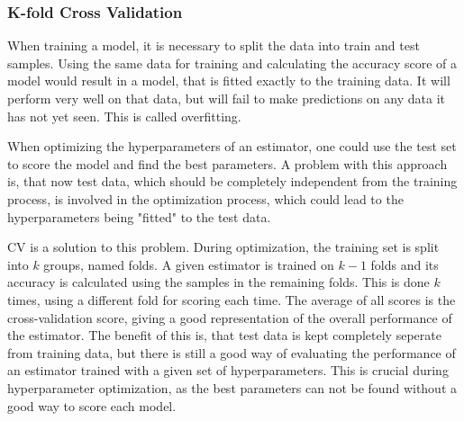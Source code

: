 \subsubsection{K-fold Cross Validation}

When training a model, it is necessary to split the data into train and test samples.
Using the same data for training and calculating the accuracy
score of a model would result in a model, that is fitted exactly to the training
data. It will perform very well on that data, but will fail to make predictions on any data
it has not yet seen. This is called overfitting.

When optimizing the hyperparameters of an estimator, one could use the test set to score
the model and find the best parameters. A problem with this approach is, that now test data,
which should be completely independent from the training process,
is involved in the optimization process, which could lead to the hyperparameters being
"fitted" to the test data.

\ac{CV} is a solution to this problem. During optimization, the training set is
split into $k$ groups, named folds. A given estimator is trained on $k-1$ folds and its accuracy
is calculated using the samples in the remaining folds. This is done $k$ times, using a different fold
for scoring each time. The average of all scores is the cross-validation score, giving a good
representation of the overall performance of the estimator.
The benefit of this is, that test data is kept completely seperate from training data, but there
is still a good way of evaluating the performance of an estimator trained with a given set
of hyperparameters. This is crucial during hyperparameter optimization, as the best parameters
can not be found without a good way to score each model.

